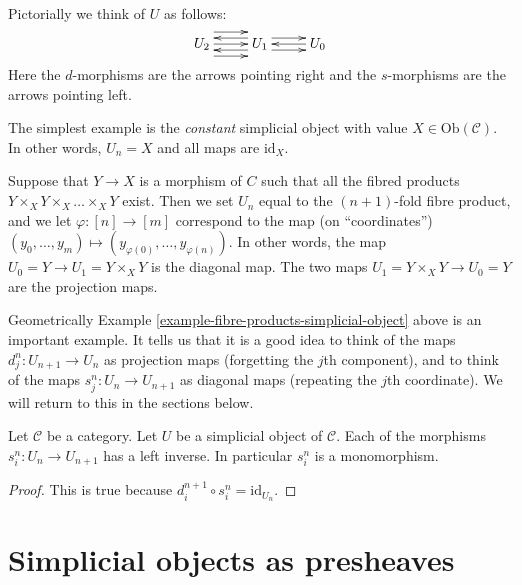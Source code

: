 \medskip\noindent
Pictorially we think of $U$ as follows:
$$
\xymatrix{
U_2
\ar@<2ex>[r]
\ar@<0ex>[r]
\ar@<-2ex>[r]
&
U_1 
\ar@<1ex>[r]
\ar@<-1ex>[r]
\ar@<1ex>[l]
\ar@<-1ex>[l]
&
U_0
\ar@<0ex>[l]
}
$$
Here the $d$-morphisms are the arrows pointing right and the 
$s$-morphisms are the arrows pointing left.

\begin{example}
\label{example-constant-simplicial-object}
The simplest example is the {\it constant} simplicial object with
value $X \in \text{Ob}(\mathcal{C})$. In other words, $U_n=X$ and
all maps are $\text{id}_X$.
\end{example}

\begin{example}
\label{example-fibre-products-simplicial-object}
Suppose that $Y\to X$ is a morphism of $C$ such that all
the fibred products $Y\times_X Y \times_X \ldots \times_X Y$ exist.
Then we set $U_n$ equal to the $(n + 1)$-fold fibre product,
and we let $\varphi: [n] \to [m]$ correspond to the map
(on ``coordinates'')
$(y_0,\ldots, y_m) \mapsto (y_{\varphi(0)},\ldots, y_{\varphi(n)})$.
In other words, the map $U_0 = Y \to U_1 = Y\times_X Y$ is the
diagonal map. The two maps $U_1 = Y\times_X Y \to U_0 = Y$ are the
projection maps.
\end{example}

\noindent
Geometrically Example \ref{example-fibre-products-simplicial-object}
above is an important example. It tells us that it is a good
idea to think of the maps $d^n_j : U_{n + 1} \to U_n$
as projection maps (forgetting the $j$th component),
and to think of the maps $s^n_j : U_n \to U_{n + 1}$
as diagonal maps (repeating the $j$th coordinate).
We will return to this in the sections below.

\begin{lemma}
\label{lemma-si-injective}
Let $\mathcal{C}$ be a category.
Let $U$ be a simplicial object of $\mathcal{C}$.
Each of the morphisms $s^n_i : U_n \to U_{n + 1}$
has a left inverse. In particular $s^n_i$ is a monomorphism.
\end{lemma}

\begin{proof}
This is true because $d_i^{n + 1} \circ s^n_i = \text{id}_{U_n}$.
\end{proof}

\section{Simplicial objects as presheaves}
\label{section-simplicial-presheaves}

